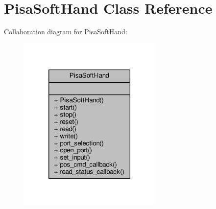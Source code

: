 \hypertarget{class_pisa_soft_hand}{\section{Pisa\-Soft\-Hand Class Reference}
\label{class_pisa_soft_hand}
}


Collaboration diagram for Pisa\-Soft\-Hand\-:
\nopagebreak
\begin{figure}[H]
\begin{center}
\leavevmode
\includegraphics[width=202pt]{class_pisa_soft_hand__coll__graph}
\end{center}
\end{figure}
